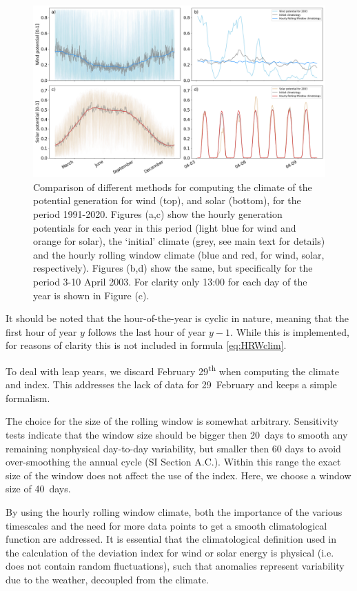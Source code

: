 \documentclass[a4paper,11pt]{extarticle}
\newcommand{\ts}[1]{\textsuperscript{#1}}
\begin{document}
\begin{figure}[hb]
        \centering
        \includegraphics[width=.95\textwidth]{Climatology_v2}
        \caption{
                Comparison of different methods for computing the climate of the potential generation for wind (top), and solar (bottom), for the period 1991-2020. 
                Figures (a,c) show the hourly generation potentials for each year in this period (light blue for wind and orange for solar), the `initial' climate (grey, see main text for details) and the hourly rolling window climate (blue and red, for wind, solar, respectively). 
                Figures (b,d) show the same, but specifically for the period 3-10 April 2003. 
                For clarity only 13:00 for each day of the year is shown in Figure (c).}
        \label{fig:climate}
\end{figure}

It should be noted that the hour-of-the-year is cyclic in nature, meaning that the first hour of year $y$ follows the last hour of year $y-1$. 
While this is implemented, for reasons of clarity this is not included in formula \ref{eq:HRWclim}. 

To deal with leap years, we discard February 29\ts{th} when computing the climate and index. 
This addresses the lack of data for 29~February and keeps a simple formalism.

The choice for the size of the rolling window is somewhat arbitrary. 
Sensitivity tests indicate that the window size should be bigger then 20~days to smooth any remaining nonphysical day-to-day variability, but smaller then 60 days to avoid over-smoothing the annual cycle (SI Section A.C.). 
Within this range the exact size of the window does not affect the use of the index. 
Here, we choose a window size of 40~days.

By using the hourly rolling window climate, both the importance of the various timescales and the need for more data points to get a smooth climatological function are addressed. 
It is essential that the climatological definition used in the calculation of the deviation index for wind or solar energy is physical (i.e. does not contain random fluctuations), such that anomalies represent variability due to the weather, decoupled from the climate.
\end{document}
